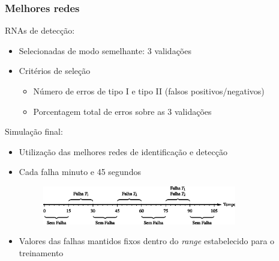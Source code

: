 \documentclass{beamer}
\begin{document}
\begin{frame}
    \frametitle{Melhores redes}

RNAs de detecção:

\begin{itemize}
    \item Selecionadas de modo semelhante: 3 validações
    \item Critérios de seleção
    \begin{itemize}
        \item Número de erros de tipo I e tipo II (falsos positivos/negativos)
        \item Porcentagem total de erros sobre as 3 validações
    \end{itemize}
\end{itemize}

Simulação final:    

\begin{itemize}
    \item Utilização das melhores redes de identificação e detecção
    \item Cada falha  minuto e 45 segundos
\begin{figure}[htb]
\centering
    \includegraphics[width=0.8\textwidth]{imgs/resultados/eps/intervalos}
\end{figure}
    \item Valores das falhas \implica mantidos fixos dentro do {\it
          range} estabelecido para o treinamento
\end{itemize}
\end{frame}

\end{document}
